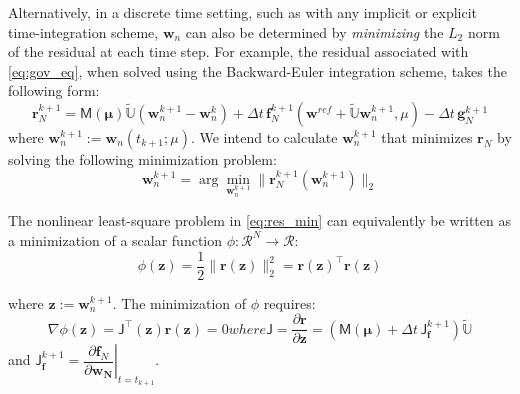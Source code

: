 \documentclass[11pt]{article}
\renewcommand{\vec}[1]{\mathbf{#1}}
\newcommand{\mat}[1]{\mathsf{#1}}
\begin{document}
        Alternatively, in a discrete time setting, such as with any implicit or explicit time-integration scheme, \(\vec{w}_n\) can also be determined by \textit{minimizing} the \(L_2\) norm of the residual at each time step.
        For example, the residual associated with \cref{eq:gov_eq}, when solved using the Backward-Euler integration scheme, takes the following form:
        \begin{equation}
        \vec{r}^{k+1}_{N} = \mat{M}(\boldsymbol{\mu})\widetilde{\mathbb{U}}\left(\vec{w}^{k+1}_n-\vec{w}^{k}_n\right) + \Delta t\,\vec{f}^{k+1}_N(\vec{w}^{ref} + \widetilde{\mathbb{U}}\vec{w}^{k+1}_n,\mu) -  \Delta t\,\vec{g}^{k+1}_N
        \end{equation}
        where $\vec{w}^{k+1}_n :=\vec{w}_n(t_{k+1};\mu)$.
        We intend to calculate $\vec{w}^{k+1}_n$ that minimizes $\vec{r}_N$ by solving the following minimization problem:
        \begin{equation}
        \vec{w}^{k+1}_n = \arg\min_{\mathbf{w}^{k+1}_n} \|\mathbf{r}_N^{k+1}(\vec{w}^{k+1}_n)\|_2
        \label{eq:res_min}
        \end{equation}


        The nonlinear least-square problem in \cref{eq:res_min} can equivalently be written as a minimization of a scalar function $\phi: \mathcal{R}^N \rightarrow \mathcal{R}$:
        \begin{equation}
        \phi(\mathbf{z}) = \frac{1}{2} \|\mathbf{r}(\mathbf{z})\|_2^2 = \mathbf{r}(\mathbf{z})^{\top} \mathbf{r}(\vec{z})
        \label{eq:gnat_opt}
        \end{equation}

        where $\vec{z} := \vec{w}^{k+1}_n$.
        The minimization of $\phi$ requires:
        \begin{subequations}

            \begin{equation}
            \nabla\phi(\vec{z})=\mat{J}^{\top}(\vec{z})\vec{r}(\vec{z}) = 0
            \label{eq:Jacobian_res}
            \end{equation}
            where
            \begin{equation}
            \mat{J} = \dfrac{\partial\vec{r}}{\partial \vec{z}} = \left(\mat{M}(\boldsymbol{\mu}) + \Delta t\,\mat{J}^{k+1}_{\vec{f}}\right)\widetilde{\mathbb{U}}
            \label{eq:jacobian}
            \end{equation}
        \end{subequations}
        and $\mat{J}^{k+1}_{\vec{f}} = \left.\dfrac{\partial{\vec{f}_N}}{\partial{\vec{\vec{w}_N}}}\right|_{t = t_{k+1}}$.
\end{document}
